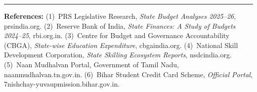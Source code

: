 \documentclass[11pt,a4paper]{article}
\begin{document}
\vspace{0.25cm}
\noindent\rule{\textwidth}{0.5pt}
{\scriptsize\textbf{References:}
(1)~PRS Legislative Research, \textit{State Budget Analyses 2025--26}, prsindia.org.
(2)~Reserve Bank of India, \textit{State Finances: A Study of Budgets 2024--25}, rbi.org.in.
(3)~Centre for Budget and Governance Accountability (CBGA), \textit{State-wise Education Expenditure}, cbgaindia.org.
(4)~National Skill Development Corporation, \textit{State Skilling Ecosystem Reports}, nsdcindia.org.
(5)~Naan Mudhalvan Portal, Government of Tamil Nadu, naanmudhalvan.tn.gov.in.
(6)~Bihar Student Credit Card Scheme, \textit{Official Portal}, 7nishchay-yuvaupmission.bihar.gov.in.
}
\end{document}
